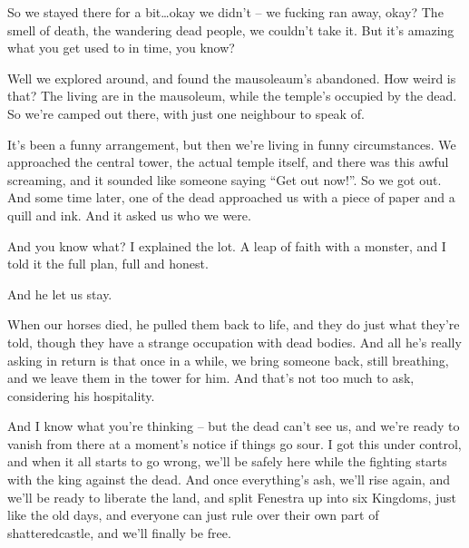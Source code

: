 \begin{speechtext}
	So we stayed there for a bit\ldots okay we didn't -- we fucking ran away, okay?  The smell of death, the wandering dead people, we couldn't take it.  But it's amazing what you get used to in time, you know?

	Well we explored around, and found the mausoleaum's abandoned.  How weird is that?  The living are in the mausoleum, while the temple's occupied by the dead.  So we're camped out there, with just one neighbour to speak of.

	It's been a funny arrangement, but then we're living in funny circumstances.  We approached the central tower, the actual temple itself, and there was this awful screaming, and it sounded like someone saying ``Get out now!''.  So we got out.  And some time later, one of the dead approached us with a piece of paper and a quill and ink.  And it asked us who we were.

	And you know what?  I explained the lot.  A leap of faith with a monster, and I told it the full plan, full and honest.

	And he let us stay.

	When our horses died, he pulled them back to life, and they do just what they're told, though they have a strange occupation with dead bodies.  And all he's really asking in return is that once in a while, we bring someone back, still breathing, and we leave them in the tower for him.  And that's not too much to ask, considering his hospitality.

	And I know what you're thinking -- but the dead can't see us, and we're ready to vanish from there at a moment's notice if things go sour.  I got this under control, and when it all starts to go wrong, we'll be safely here while the fighting starts with the king against the dead.  And once everything's ash, we'll rise again, and we'll be ready to liberate the land, and split Fenestra up into six Kingdoms, just like the old days, and everyone can just rule over their own part of \gls{shatteredcastle}, and we'll finally be free.

\end{speechtext}




